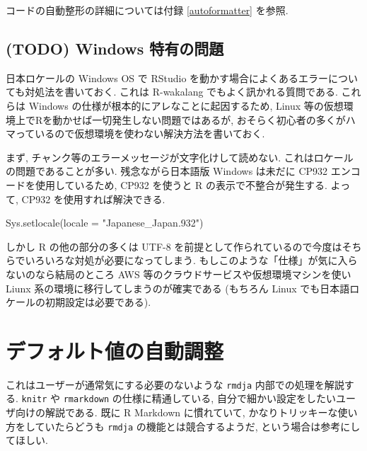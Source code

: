 \documentclass[
]{bxjsbook}
\newenvironment{Shaded}{\begin{snugshade}}{\end{snugshade}}
\newcommand{\AttributeTok}[1]{\textcolor[rgb]{0.77,0.63,0.00}{#1}}
\newcommand{\FunctionTok}[1]{\textcolor[rgb]{0.00,0.00,0.00}{#1}}
\newcommand{\NormalTok}[1]{#1}
\newcommand{\StringTok}[1]{\textcolor[rgb]{0.31,0.60,0.02}{#1}}
\theoremstyle{definition}
\theoremstyle{definition}
\theoremstyle{definition}
\theoremstyle{remark}
\begin{document}
コードの自動整形の詳細については付録 \ref{autoformatter} を参照.

\hypertarget{todo-windows-ux7279ux6709ux306eux554fux984c}{%
\section{(TODO) Windows
特有の問題}\label{todo-windows-ux7279ux6709ux306eux554fux984c}}

日本ロケールの Windows OS で RStudio
を動かす場合によくあるエラーについても対処法を書いておく. これは
R-wakalang でもよく訊かれる質問である. これらは Windows
の仕様が根本的にアレなことに起因するため, Linux
等の仮想環境上でRを動かせば一切発生しない問題ではあるが,
おそらく初心者の多くがハマっているので仮想環境を使わない解決方法を書いておく.

まず, チャンク等のエラーメッセージが文字化けして読めない.
これはロケールの問題であることが多い. 残念ながら日本語版 Windows
は未だに CP932 エンコードを使用しているため, CP932 を使うと R
の表示で不整合が発生する. よって, CP932 を使用すれば解決できる.

\begin{Shaded}
\begin{Highlighting}[numbers=left,,]
\FunctionTok{Sys.setlocale}\NormalTok{(}\AttributeTok{locale =} \StringTok{"Japanese\_Japan.932"}\NormalTok{)}
\end{Highlighting}
\end{Shaded}

しかし R の他の部分の多くは UTF-8
を前提として作られているので今度はそちらでいろいろな対処が必要になってしまう.
もしこのような「仕様」が気に入らないのなら結局のところ AWS
等のクラウドサービスや仮想環境マシンを使い Liunx
系の環境に移行してしまうのが確実である (もちろん Linux
でも日本語ロケールの初期設定は必要である).

\hypertarget{appendix-ux88dcux907a}{%
\appendix}


\hypertarget{default-property}{%
\chapter{デフォルト値の自動調整}\label{default-property}}

これはユーザーが通常気にする必要のないような \texttt{rmdja}
内部での処理を解説する. \texttt{knitr} や \texttt{rmarkdown}
の仕様に精通している, 自分で細かい設定をしたいユーザ向けの解説である.
既に R Markdown に慣れていて, かなりトリッキーな使い方をしていたらどうも
\texttt{rmdja} の機能とは競合するようだ, という場合は参考にしてほしい.
\end{document}
